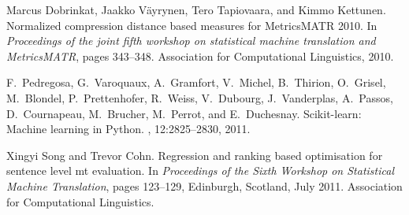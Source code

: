 \documentclass[11pt,twocolumn]{article}
\begin{document}
\begin{thebibliography}{1}

Marcus Dobrinkat, Jaakko V{\"a}yrynen, Tero Tapiovaara, and Kimmo Kettunen.
\newblock Normalized compression distance based measures for {MetricsMATR}
  2010.
\newblock In {\em Proceedings of the joint fifth workshop on statistical
  machine translation and {MetricsMATR}}, pages 343--348. Association for
  Computational Linguistics, 2010.

F.~Pedregosa, G.~Varoquaux, A.~Gramfort, V.~Michel, B.~Thirion, O.~Grisel,
  M.~Blondel, P.~Prettenhofer, R.~Weiss, V.~Dubourg, J.~Vanderplas, A.~Passos,
  D.~Cournapeau, M.~Brucher, M.~Perrot, and E.~Duchesnay.
\newblock Scikit-learn: Machine learning in {Python}.
, 12:2825--2830, 2011.

Xingyi Song and Trevor Cohn.
\newblock Regression and ranking based optimisation for sentence level mt
  evaluation.
\newblock In {\em Proceedings of the Sixth Workshop on Statistical Machine
  Translation}, pages 123--129, Edinburgh, Scotland, July 2011. Association for
  Computational Linguistics.

\end{thebibliography}
\end{document}
